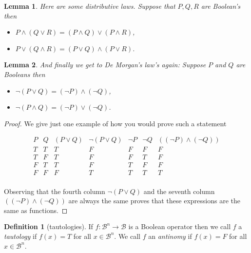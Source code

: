 \documentclass[
]{book}
\newtheorem{lemma}{Lemma}[chapter]
\theoremstyle{definition}
\newtheorem{definition}{Definition}[chapter]
\theoremstyle{definition}
\theoremstyle{definition}
\theoremstyle{definition}
\theoremstyle{remark}
\begin{document}
\begin{lemma}

Here are some distributive laws. Suppose that \(P, Q, R\) are Boolean's then

\begin{itemize}
\item
  \(P \wedge (Q \vee R) = (P \wedge Q) \vee (P \wedge R)\),
\item
  \(P \vee (Q \wedge R) = (P \vee Q) \wedge (P \vee R)\).
\end{itemize}

\end{lemma}

\begin{lemma}

And finally we get to De Morgan's law's again:
Suppose \(P\) and \(Q\) are Booleans then

\begin{itemize}
\item
  \(\neg (P \vee Q) = (\neg P) \wedge (\neg Q)\),
\item
  \(\neg (P \wedge Q) = (\neg P) \vee (\neg Q)\).
\end{itemize}

\end{lemma}

\begin{proof}
We give just one example of how you would prove such a statement

\begin{equation*}
\begin{array}{cc|ccccc}
P & Q & (P \vee Q) & \neg (P \vee Q) & \neg P & \neg Q & ((\neg P) \wedge (\neg Q)) \\
\hline
T & T & T & F & F & F & F\\
T & F & T & F & F & T & F\\
F & T & T & F & T & F & F\\
F & F & F & T & T & T & T \\
\end{array}
\end{equation*}

Observing that the fourth column \(\neg (P \vee Q)\) and the seventh column \(((\neg P) \wedge (\neg Q))\) are always the same proves that these expressions are the same as functions.
\end{proof}

\begin{definition}[tautologies]
If \(f: \mathcal{B}^n \rightarrow \mathcal{B}\) is a Boolean operator then we call \(f\) a \emph{tautology} if \(f(x) = T\) for all \(x \in \mathcal{B}^n\). We call \(f\) an \emph{antinomy} if \(f(x) = F\) for all \(x \in \mathcal{B}^n\).
\end{definition}
\end{document}

